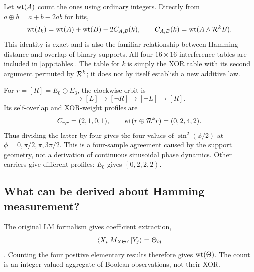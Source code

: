 Let $\operatorname{wt}(A)$ count the ones using ordinary integers. Directly from $a\oplus b=a+b-2ab$ for bits,
\begin{equation}\label{eq:xorweight}
 \operatorname{wt}(I_k)=\operatorname{wt}(A)+\operatorname{wt}(B)-2C_{A,B}(k),\qquad
 C_{A,B}(k)=\operatorname{wt}(A\land\mathcal R^kB).
\end{equation}
This identity is exact and is also the familiar relationship between Hamming distance and overlap of binary supports. All four $16\times16$ interference tables are included in \cref{app:tables}. The table for $k$ is simply the XOR table with its second argument permuted by $\mathcal R^k$; it does not by itself establish a new additive law.

For $r=[R]=E_0\oplus E_3$, the clockwise orbit is
\begin{equation}
 [R]\longrightarrow[L]\longrightarrow[\neg R]\longrightarrow[\neg L]\longrightarrow[R].
\end{equation}
Its self-overlap and XOR-weight profiles are
\begin{equation}
 C_{r,r}=(2,1,0,1),\qquad \operatorname{wt}(r\oplus\mathcal R^kr)=(0,2,4,2).
\end{equation}
Thus dividing the latter by four gives the four values of $\sin^2(\phi/2)$ at $\phi=0,\pi/2,\pi,3\pi/2$. This is a four-sample agreement caused by the support geometry, not a derivation of continuous sinusoidal phase dynamics. Other carriers give different profiles: $E_0$ gives $(0,2,2,2)$.

\subsection{What can be derived about Hamming measurement?}
The original LM formalism gives coefficient extraction,
\begin{equation}
 \langle X_i\rvert M_{X\Theta Y}\lvert Y_j\rangle=\Theta_{ij}
\end{equation}
\cite[Section 4.1.4]{droncheff}. Counting the four positive elementary results therefore gives $\operatorname{wt}(\Theta)$. The count is an integer-valued aggregate of Boolean observations, not their XOR.

